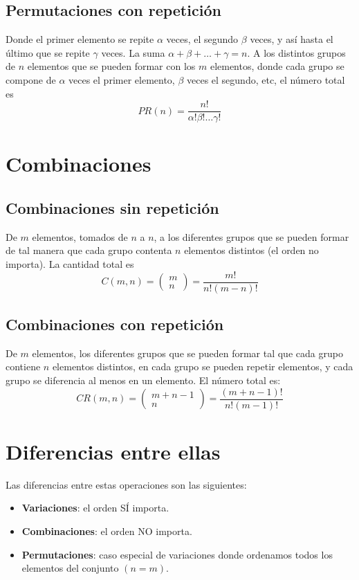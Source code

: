 \documentclass{./Probabilidad.tex}
\begin{document}
\subsection{Permutaciones con repetición}
Donde el primer elemento se repite $\alpha$ veces, el segundo $\beta$ veces, y así hasta el último que se repite $\gamma$ veces. La suma $\alpha+\beta+\dots+\gamma=n$. A los distintos grupos de $n$ elementos que se pueden formar con los $m$ elementos, donde cada grupo se compone de $\alpha$ veces el primer elemento, $\beta$ veces el segundo, etc, el número total es
$$
PR(n)= \frac{n!}{\alpha!\beta!\dots\gamma!}
$$
\section{Combinaciones}
\subsection{Combinaciones sin repetición}
De $m$ elementos, tomados de $n$ a $n$, a los diferentes grupos que se pueden formar de tal manera que cada grupo contenta $n$ elementos distintos (el orden no importa). La cantidad total es
$$
C(m,n) = \begin{pmatrix}
m \\ n
\end{pmatrix} = \frac{m!}{n!(m-n)!}
$$
\subsection{Combinaciones con repetición}
De $m$ elementos, los diferentes grupos que se pueden formar tal que cada grupo contiene $n$ elementos distintos, en cada grupo se pueden repetir elementos, y cada grupo se diferencia al menos en un elemento. El número total es:
$$
CR(m,n) = \begin{pmatrix}
m+n-1 \\ n
\end{pmatrix} = \frac{(m+n-1)!}{n!(m-1)!}
$$
\section{Diferencias entre ellas}
Las diferencias entre estas operaciones son las siguientes:
\begin{itemize}
	\item \textbf{Variaciones}: el orden SÍ importa.
	\item \textbf{Combinaciones}: el orden NO importa.
	\item \textbf{Permutaciones}: caso especial de variaciones donde ordenamos todos los elementos del conjunto $(n=m)$. 
\end{itemize}
\end{document}
